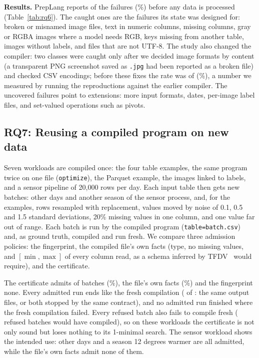 \documentclass[conference]{IEEEtran}
\begin{document}
\textbf{Results.} PrepLang reports \RbEarly{} of the \RbTotal{} failures (\RbEarlyPct\%) before any
data is processed (Table~\ref{tab:rq6}). The caught ones are the failures its state was designed
for: broken or misnamed image files, text in numeric columns, missing columns, gray or RGBA images
where a model needs RGB, keys missing from another table, images without labels, and files that are
not UTF-8. The study also changed the compiler: two classes were caught only after we decided image
formats by content (a transparent PNG screenshot saved as \texttt{.jpg} had been reported as a broken
file) and checked CSV encodings; before these fixes the rate was \RbBefore{} of \RbTotal{}
(\RbBeforePct\%), a number we measured by running the reproductions against the earlier compiler.
The uncovered failures point to extensions: more input formats, dates, per-image label files, and
set-valued operations such as pivots.

\subsection{RQ7: Reusing a compiled program on new data}

Seven workloads are compiled once: the four table examples, the same program twice on one file
(\texttt{optimize}), the Parquet example, the images linked to labels, and a sensor pipeline of
20,000 rows per day. Each input table then gets new batches: other days and another season of the
sensor process, and, for the examples, rows resampled with replacement, values moved by noise of
0.1, 0.5 and 1.5 standard deviations, 20\% missing values in one column, and one value far out of
range. Each batch is run by the compiled program (\texttt{table=batch.csv}) and, as ground truth,
compiled and run fresh. We compare three admission policies: the fingerprint, the compiled file's
own facts (type, no missing values, and $[\min,\max]$ of every column read, as a schema inferred by
TFDV~\cite{breck2019} would require), and the certificate.



The certificate admits \CertAdmit{} of \CertBatches{} batches (\CertAdmitPct\%), the file's own
facts \FactsAdmit{} (\FactsAdmitPct\%) and the fingerprint none. Every admitted run ends like the
fresh compilation (\CertAgree{} of \CertAdmit{}: the same output files, or both stopped by the
same contract), and no admitted run finished where the fresh compilation failed. Every refused
batch also fails to compile fresh (\CertFalse{} refused batches would have compiled), so on these
workloads the certificate is not only sound but loses nothing to its 1-minimal search. The sensor
workload shows the intended use: other days and a season 12 degrees warmer are all admitted, while
the file's own facts admit none of them.
\end{document}

